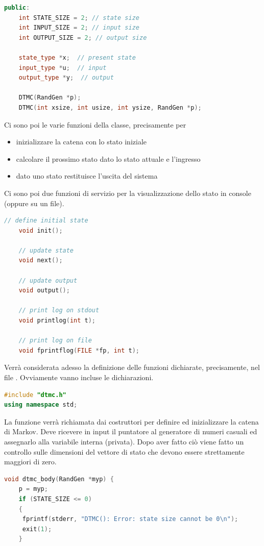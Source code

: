 \documentclass[10pt, letterpaper]{report}
\begin{document}
\begin{lstlisting}[style=CppStyle,language=C++]
public:
    int STATE_SIZE = 2; // state size
    int INPUT_SIZE = 2; // input size
    int OUTPUT_SIZE = 2; // output size
  
    state_type *x;  // present state
    input_type *u;  // input
    output_type *y;  // output
  
    DTMC(RandGen *p);
    DTMC(int xsize, int usize, int ysize, RandGen *p);  
\end{lstlisting}
Ci sono poi le varie funzioni della classe, precisamente per \begin{itemize}
    \item inizializzare la catena con lo stato iniziale 
    \item calcolare il prossimo stato dato lo stato attuale e l'ingresso 
    \item dato uno stato restituisce l'uscita del sistema
\end{itemize}
Ci sono poi due funzioni di servizio per la visualizzazione dello stato in console (oppure su un file).
\begin{lstlisting}[style=CppStyle,language=C++]
    // define initial state
    void init();
  
    // update state
    void next();
    
    // update output
    void output();
  
    // print log on stdout
    void printlog(int t);
  
    // print log on file
    void fprintflog(FILE *fp, int t);
\end{lstlisting}
Verrà considerata adesso la definizione delle funzioni dichiarate, precisamente, nel file . Ovviamente vanno incluse le dichiarazioni.
\begin{lstlisting}[style=CppStyle,language=C++]
#include "dtmc.h"
using namespace std;
\end{lstlisting}
La funzione  verrà richiamata dai costruttori per definire ed inizializzare la catena di Markov. Deve ricevere in input il puntatore al generatore di numeri casuali ed assegnarlo alla variabile interna (privata). Dopo aver fatto ciò 
viene fatto un controllo sulle dimensioni del vettore di stato che devono essere strettamente 
maggiori di zero.
\begin{lstlisting}[style=CppStyle,language=C++]
void dtmc_body(RandGen *myp) {
    p = myp;
    if (STATE_SIZE <= 0)
    {
     fprintf(stderr, "DTMC(): Error: state size cannot be 0\n");
     exit(1);
    }
\end{lstlisting}
\end{document}

